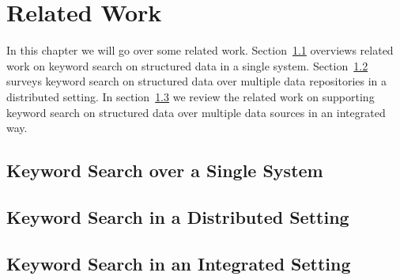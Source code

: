\chapter{Related Work}\label{chap:related}

In this chapter we will go over some related work. Section~\ref{related:single} overviews related
work on keyword search on structured data in a single system. Section~\ref{related:distributed}
surveys keyword search on structured data over multiple data repositories in a distributed setting.
In section~\ref{related:integrated} we review the related work on supporting keyword search on
structured data over multiple data sources in an integrated way.

\section{Keyword Search over a Single System}\label{related:single}


\section{Keyword Search in a Distributed Setting}\label{related:distributed} 


\section{Keyword Search in an Integrated Setting}\label{related:integrated}





